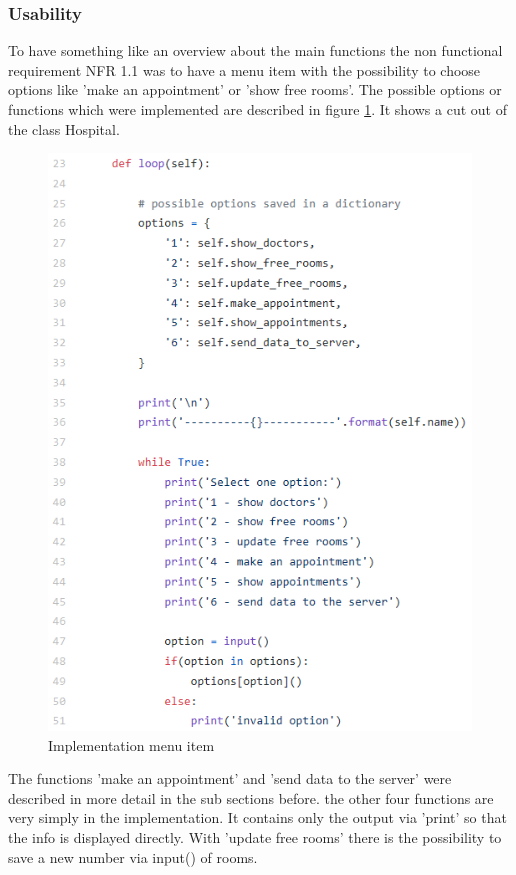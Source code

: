 \subsubsection{Usability}
To have something like an overview about the main functions the non functional requirement NFR 1.1 was to have a menu item with the possibility to choose options like 'make an appointment' or 'show free rooms'. The possible options or functions which were implemented are described in figure \ref{Options}. It shows a cut out of the class Hospital.

\begin{figure}
\centering
\sidecaption
\includegraphics[scale=.65]{images/melanie_images/Options.png}
\caption{Implementation menu item}
\label{Options}
\end{figure}

The functions 'make an appointment' and 'send data to the server' were described in more detail in the sub sections before. the other four functions are very simply in the implementation. It contains only the output via 'print' so that the info is displayed directly. With 'update free rooms' there is the possibility to save a new number via input() of rooms.

